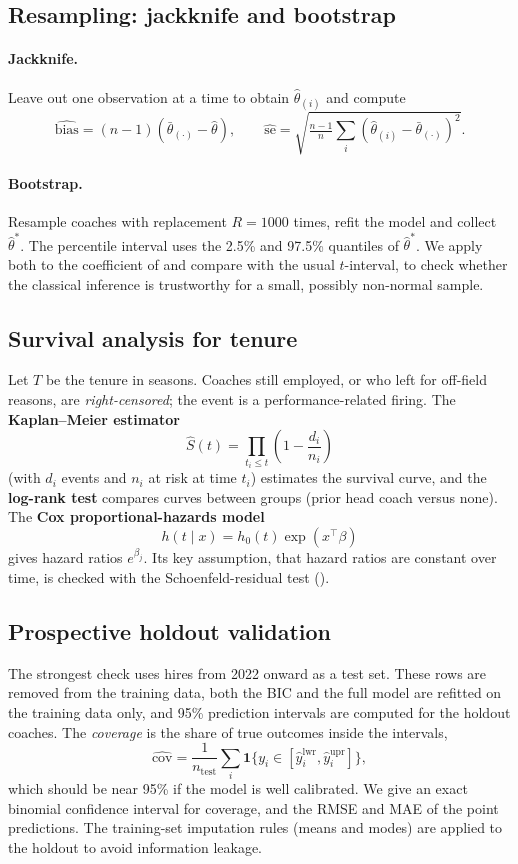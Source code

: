 \documentclass[9pt,a4paper]{article}
\newcommand{\var}[1]{\texttt{\detokenize{#1}}}
\begin{document}
\subsection{Resampling: jackknife and bootstrap}
\paragraph{Jackknife.} Leave out one observation at a time to obtain $\hat\theta_{(i)}$ and compute
\[
\widehat{\mathrm{bias}}=(n-1)(\bar\theta_{(\cdot)}-\hat\theta),\qquad
\widehat{\mathrm{se}}=\sqrt{\tfrac{n-1}{n}\sum_i(\hat\theta_{(i)}-\bar\theta_{(\cdot)})^2}.
\]
\paragraph{Bootstrap.} Resample coaches with replacement $R=1000$ times, refit the model and collect $\hat\theta^*$. The percentile interval uses the 2.5\% and 97.5\% quantiles of $\hat\theta^*$. We apply both to the coefficient of \var{AllPriorWinPct} and compare with the usual $t$-interval, to check whether the classical inference is trustworthy for a small, possibly non-normal sample.

\subsection{Survival analysis for tenure}
Let $T$ be the tenure in seasons. Coaches still employed, or who left for off-field reasons, are \emph{right-censored}; the event is a performance-related firing. The \textbf{Kaplan--Meier estimator}
\[
\hat S(t)=\prod_{t_i\le t}\left(1-\frac{d_i}{n_i}\right)
\]
(with $d_i$ events and $n_i$ at risk at time $t_i$) estimates the survival curve, and the \textbf{log-rank test} compares curves between groups (prior head coach versus none). The \textbf{Cox proportional-hazards model}
\[
h(t\mid x)=h_0(t)\exp(x^\top\beta)
\]
gives hazard ratios $e^{\beta_j}$. Its key assumption, that hazard ratios are constant over time, is checked with the Schoenfeld-residual test (\var{cox.zph}).

\subsection{Prospective holdout validation}
The strongest check uses hires from 2022 onward as a test set. These rows are removed from the training data, both the BIC and the full model are refitted on the training data only, and 95\% prediction intervals are computed for the holdout coaches. The \emph{coverage} is the share of true outcomes inside the intervals,
\[
\widehat{\mathrm{cov}}=\frac{1}{n_{\text{test}}}\sum_{i}\mathbf 1\{y_i\in[\hat y_i^{\text{lwr}},\hat y_i^{\text{upr}}]\},
\]
which should be near 95\% if the model is well calibrated. We give an exact binomial confidence interval for coverage, and the RMSE and MAE of the point predictions. The training-set imputation rules (means and modes) are applied to the holdout to avoid information leakage.
\end{document}
